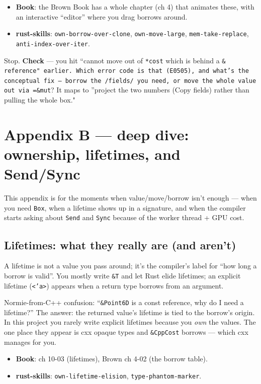 \documentclass[11pt]{article}
\begin{document}
\begin{itemize}
\item \textbf{\textbf{Book}}: the Brown Book has a whole chapter (ch 4) that animates these,
with an interactive ``editor'' where you drag borrows around.
\item \textbf{\textbf{rust-skills}}: \texttt{own-borrow-over-clone}, \texttt{own-move-large},
\texttt{mem-take-replace}, \texttt{anti-index-over-iter}.
\end{itemize}

Stop. \textbf{\textbf{Check}} — you hit ``cannot move out of \texttt{*cost} which is behind a \texttt{\&
reference" earlier. Which error code is that (E0505), and what's the conceptual
fix — borrow the /fields/ you need, or move the whole value out via =\&mut}? It
maps to ''project the two numbers (Copy fields) rather than pulling the whole
box."
\section{Appendix B — deep dive: ownership, lifetimes, and Send/Sync}
\label{sec:orgcd07793}

This appendix is for the moments when value/move/borrow isn't enough — when you
need \texttt{Box}, when a lifetime shows up in a signature, and when the compiler
starts asking about \texttt{Send} and \texttt{Sync} because of the worker thread + GPU cost.
\subsection{Lifetimes: what they really are (and aren't)}
\label{sec:orgd25fa93}

A lifetime is not a value you pass around; it's the compiler's label for ``how
long a borrow is valid''. You mostly write \texttt{\&T} and let Rust elide lifetimes; an
explicit lifetime (\texttt{<'a>}) appears when a return type borrows from an argument.

Normie-from-C++ confusion: ``\texttt{\&Point6D} is a const reference, why do I need a
lifetime?'' The answer: the returned value's lifetime is tied to the borrow's
origin. In this project you rarely write explicit lifetimes because you \emph{own}
the values. The one place they appear is cxx opaque types and \texttt{\&CppCost}
borrows — which cxx manages for you.

\begin{itemize}
\item \textbf{\textbf{Book}}: ch 10-03 (lifetimes), Brown ch 4-02 (the borrow table).
\item \textbf{\textbf{rust-skills}}: \texttt{own-lifetime-elision}, \texttt{type-phantom-marker}.
\end{itemize}
\end{document}
